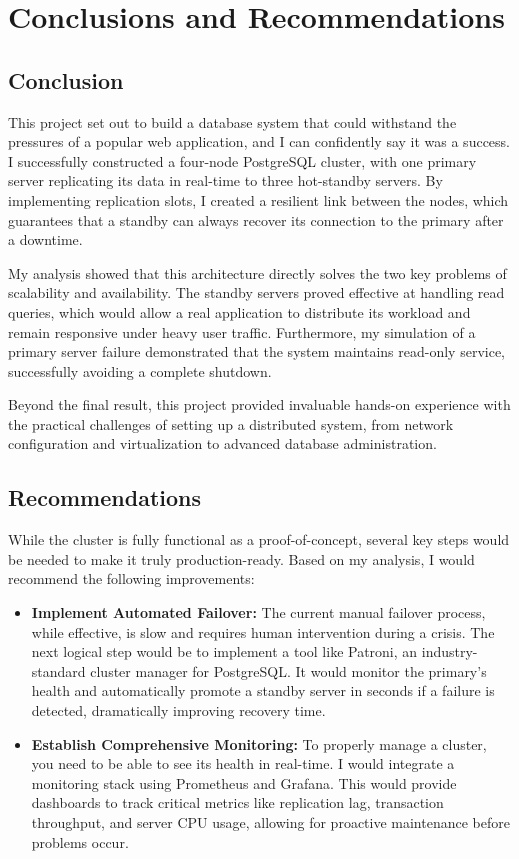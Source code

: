 \documentclass[conference]{IEEEtran}
\begin{document}
\section{Conclusions and Recommendations}

\subsection{Conclusion}

This project set out to build a database system that could withstand the pressures of a popular web application, and I can confidently say it was a success. I successfully constructed a four-node PostgreSQL cluster, with one primary server replicating its data in real-time to three hot-standby servers. By implementing replication slots, I created a resilient link between the nodes, which guarantees that a standby can always recover its connection to the primary after a downtime.

My analysis showed that this architecture directly solves the two key problems of scalability and availability. The standby servers proved effective at handling read queries, which would allow a real application to distribute its workload and remain responsive under heavy user traffic. Furthermore, my simulation of a primary server failure demonstrated that the system maintains read-only service, successfully avoiding a complete shutdown.

Beyond the final result, this project provided invaluable hands-on experience with the practical challenges of setting up a distributed system, from network configuration and virtualization to advanced database administration.

\subsection{Recommendations}

While the cluster is fully functional as a proof-of-concept, several key steps would be needed to make it truly production-ready. Based on my analysis, I would recommend the following improvements:

\begin{itemize}
\item \textbf{Implement Automated Failover:} The current manual failover process, while effective, is slow and requires human intervention during a crisis. The next logical step would be to implement a tool like Patroni, an industry-standard cluster manager for PostgreSQL. It would monitor the primary's health and automatically promote a standby server in seconds if a failure is detected, dramatically improving recovery time.

\item \textbf{Establish Comprehensive Monitoring:} To properly manage a cluster, you need to be able to see its health in real-time. I would integrate a monitoring stack using Prometheus and Grafana. This would provide dashboards to track critical metrics like replication lag, transaction throughput, and server CPU usage, allowing for proactive maintenance before problems occur.

\end{itemize}
\appendices
\end{document}
